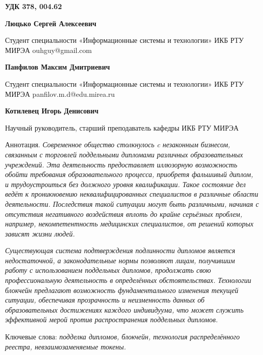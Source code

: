\documentclass{mirea-article}
\begin{document}
\textbf{УДК 378, 004.62}

\begin{FlushRight}
	\textbf{Люцько Сергей Алексеевич}

	Студент специальности «Информационные системы и технологии» ИКБ РТУ МИРЭА ouhguy@gmail.com

	\textbf{Панфилов Максим Дмитриевич}

	Студент специальности «Информационные системы и технологии» ИКБ РТУ МИРЭА panfilov.m.d@edu.mirea.ru

	\textbf{Котилевец Игорь Денисович}

	Научный руководитель, старший преподаватель кафедры ИКБ РТУ МИРЭА

\end{FlushRight}


Аннотация. \textit{Современное общество столкнулось c незаконным бизнесом, связанным с торговлей поддельными дипломами различных образовательных учреждений. Эта деятельность предоставляет иллюзорную возможность обойти требования образовательного процесса, приобретя фальшивый диплом, и трудоустроиться без должного уровня квалификации. Такое состояние дел ведёт к проникновению неквалифицированных специалистов в различные области деятельности. Последствия такой ситуации могут быть различными, начиная с отсутствия негативного воздействия вплоть до крайне серьёзных проблем, например, некомпетентность медицинских специалистов, от решений которых зависят жизни людей.}

\textit{Существующая система подтверждения подлинности дипломов является недостаточной, а законодательные нормы позволяют лицам, получившим работу с использованием поддельных дипломов, продолжать свою профессиональную деятельность в определённых обстоятельствах.
Технологии блокчейн предлагают возможность фундаментального изменения текущей ситуации, обеспечивая прозрачность и неизменность данных об образовательных достижениях каждого индивидуума, что может служить эффективной мерой против распространения поддельных дипломов.}


Ключевые слова: \textit{подделка дипломов, блокчейн, технология распределённого реестра, невзаимозаменяемые токены.}

\end{document}
